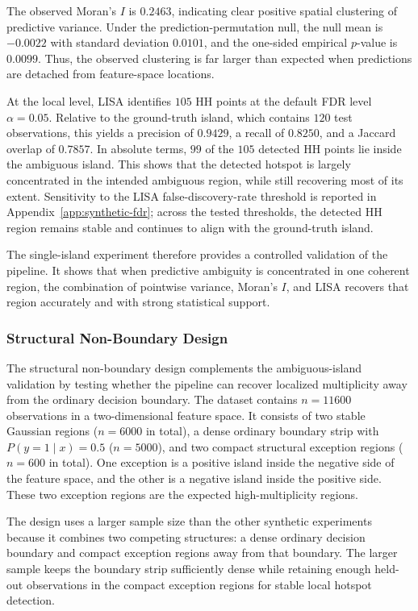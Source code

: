 The observed Moran's $I$ is $0.2463$, indicating clear positive spatial
clustering of predictive variance. Under the prediction-permutation null,
the null mean is $-0.0022$ with standard deviation $0.0101$, and the
one-sided empirical $p$-value is $0.0099$. 
Thus, the observed clustering is far larger than expected when predictions are detached from feature-space
locations.

At the local level, LISA identifies $105$ HH points at the default FDR level
$\alpha = 0.05$. Relative to the ground-truth island, which contains $120$ test
observations, this yields a precision of $0.9429$, a recall of $0.8250$, and a Jaccard
overlap of $0.7857$. In absolute terms, $99$ of the $105$ detected HH points lie inside
the ambiguous island. This shows that the detected hotspot is largely concentrated in the intended ambiguous
region, while still recovering most of its extent. Sensitivity to the LISA false-discovery-rate threshold is reported in
Appendix~\ref{app:synthetic-fdr}; across the tested thresholds, the detected HH region
remains stable and continues to align with the ground-truth island.

The single-island experiment therefore provides a controlled validation of the pipeline. It
shows that when predictive ambiguity is concentrated in one coherent region, the
combination of pointwise variance, Moran's $I$, and LISA recovers that region accurately
and with strong statistical support.

\subsubsection{Structural Non-Boundary Design}

The structural non-boundary design complements the ambiguous-island validation by
testing whether the pipeline can recover localized multiplicity away from the ordinary
decision boundary. The dataset contains $n=11600$ observations in a two-dimensional
feature space. It consists of two stable Gaussian regions ($n=6000$ in total), a dense
ordinary boundary strip with $P(y=1\mid x)=0.5$ ($n=5000$), and two compact structural
exception regions ($n=600$ in total). One exception is a positive island inside the
negative side of the feature space, and the other is a negative island inside the positive
side. These two exception regions are the expected high-multiplicity regions.

The design uses a larger sample size than the other synthetic experiments because it
combines two competing structures: a dense ordinary decision boundary and compact
exception regions away from that boundary. The larger sample keeps the boundary strip
sufficiently dense while retaining enough held-out observations in the compact exception
regions for stable local hotspot detection.

